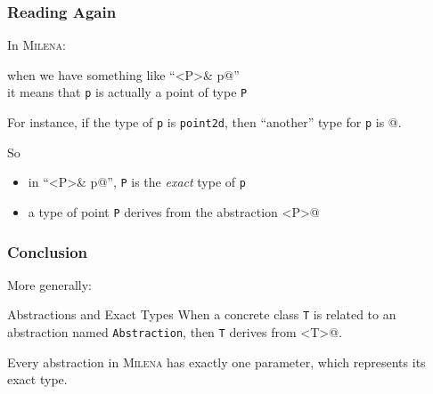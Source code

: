 \documentclass{beamer}
\newcommand{\code}[1]{{\scriptsize{\texttt{#1}}}\xspace}
\newcommand{\mln}{\textsc{Milena}\xspace}
\begin{document}
\begin{frame}[fragile]
  \frametitle{Reading Again}

In \mln:
\begin{center}
  when we have something like ``\lstinline@Point<P>& p@'' \\
  it means that \code{p} is actually a point of type \code{P}
\end{center}

For instance, if the type of \code{p} is \code{point2d}, then
``another'' type for \code{p} is @.

\smallskip

So
\begin{itemize}
\item in ``\lstinline@Point<P>& p@'', \code{P} is the \emph{exact} type of \code{p}
\item a type of point \code{P} derives from the abstraction \lstinline@Point<P>@
\end{itemize}

\end{frame}


\begin{frame}[fragile]
  \frametitle{Conclusion}

More generally:

\begin{block}{Abstractions and Exact Types}
  When a concrete class \code{T} is related to an abstraction named \code{Abstraction},
  then \code{T} derives from \lstinline@Abstraction<T>@.

  \smallskip

  Every abstraction in \mln has exactly one parameter, which
  represents its exact type.
\end{block}

\end{frame}
\end{document}
